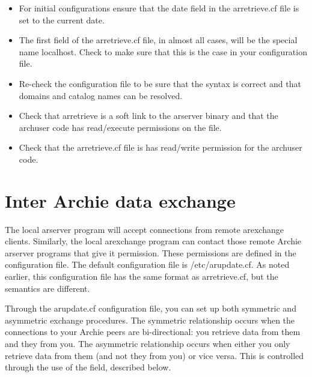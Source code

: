 \begin{itemize}

\item For initial configurations ensure that the date field in the arretrieve.cf file is set to the current date.

\item The first field of the arretrieve.cf file, in almost all cases, will be the special name localhost. Check to make sure that this is the case in your configuration file.

\item Re-check the configuration file to be sure that the syntax is correct and that domains and catalog names can be resolved.

\item Check that arretrieve is a soft link to the arserver binary and that the archuser code has read/execute permissions on the file. 

\item Check that the arretrieve.cf file is has read/write permission for the archuser code.
\end{itemize}



%
%
%

\section{Inter Archie data exchange}

The local arserver program will accept connections from remote arexchange
clients. Similarly, the local arexchange program can contact those remote Archie
arserver programs that give it permission. These permissions are
defined in the configuration file. The default configuration file is
\archie/etc/arupdate.cf. As noted earlier, this configuration file has the
same format as arretrieve.cf, but the semantics are different.

Through the arupdate.cf configuration file, you can set up both symmetric and asymmetric exchange procedures. The symmetric relationship occurs when the connections to your Archie peers are bi-directional: you retrieve data from them and they from you. The asymmetric relationship occurs when either you only retrieve data from them (and not they from you) or vice versa. This is controlled through the use of the  field, described below.






